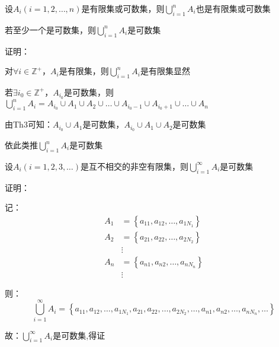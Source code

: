 \begin{la}
设$A_{i}\left(i =1,2,\dots,n\right) $是有限集或可数集，则$\bigcup \limits_{i=1}^{n}A_{i}$也是有限集或可数集
\par \quad 若至少一个是可数集，则$\bigcup \limits_{i=1}^{n}A_{i}$是可数集    
\end{la}
\noindent 证明：
\par {} 对$\forall i \in \mathbb{Z^{+}}$，$A_{i}$是有限集，则$\bigcup \limits_{i=1}^{n}A_{i}$是有限集显然
\par {} 若$\exists i_{0} \in \mathbb{Z}^{+}$，$A_{i_{0}}$是可数集，则$\bigcup \limits_{i=1}^{n}A_{i} = A_{i_{0}}\cup A_{1}\cup A_{2}\cup \dots\cup A_{i_{0}-1}\cup A_{i_{0}+1}\cup \dots\cup A_{n}$
\par \quad 由Th3可知：$A_{i_{0}}\cup A_{1}$是可数集，$A_{i_{0}}\cup A_{1}\cup A_{2}$是可数集
\par \quad 依此类推$\bigcup \limits_{i=1}^{n}A_{i}$是可数集

\begin{wa}
设$A_{i}\left(i =1,2,3,\dots\right) $是互不相交的非空有限集，则$\bigcup \limits_{i=1}^{\infty}A_{i}$是可数集    
\end{wa}
\noindent 证明：
\par 记：
\begin{align*}
    A_{1} & =\left\{a_{11},a_{12},\dots,a_{1N_{1}}\right\} \\
    A_{2} & =\left\{a_{21},a_{22},\dots,a_{2N_{2}}\right\} \\
    & \vdots \\
    A_{n} & =\left\{a_{n1},a_{n2},\dots,a_{nN_{n}}\right\} \\
    & \vdots 
\end{align*}
\par 则：
$$\bigcup \limits_{i=1}^{\infty}A_{i} = \left\{a_{11},a_{12},\dots,a_{1N_{1}},a_{21},a_{22},\dots,a_{2N_{2}},\dots,a_{n1},a_{n2},\dots,a_{nN_{n}},\dots\right\}$$
\par 故：$\bigcup \limits_{i=1}^{\infty}A_{i}$是可数集,得证

